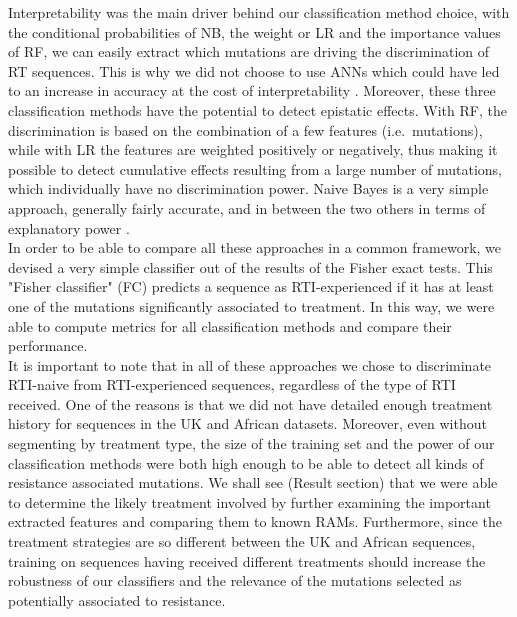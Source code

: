 \documentclass[
  11pt,
  twoside]{scrbook}
\begin{document}
Interpretability was the main driver behind our classification method
choice, with the conditional probabilities of NB, the weight or LR and
the importance values of RF, we can easily extract which mutations are
driving the discrimination of RT sequences. This is why we did not
choose to use ANNs which could have led to an increase in accuracy at
the cost of interpretability
\autocite{alvarezmelisRobustInterpretabilitySelfExplaining2018,hastieElementsStatisticalLearning2009,zhangInterpretableConvolutionalNeural2018}.
Moreover, these three classification methods have the potential to
detect epistatic effects. With RF, the discrimination is based on the
combination of a few features (i.e.~mutations), while with LR the
features are weighted positively or negatively, thus making it possible
to detect cumulative effects resulting from a large number of mutations,
which individually have no discrimination power. Naive Bayes is a very
simple approach, generally fairly accurate, and in between the two
others in terms of explanatory power
\autocite{gascuelTwelveNumericalSymbolic1998}.\\
In order to be able to compare all these approaches in a common
framework, we devised a very simple classifier out of the results of the
Fisher exact tests. This "Fisher classifier" (FC) predicts a sequence
as RTI-experienced if it has at least one of the mutations significantly
associated to treatment. In this way, we were able to compute metrics
for all classification methods and compare their performance.\\
It is important to note that in all of these approaches we chose to
discriminate RTI-naive from RTI-experienced sequences, regardless of the
type of RTI received. One of the reasons is that we did not have
detailed enough treatment history for sequences in the UK and African
datasets. Moreover, even without segmenting by treatment type, the size
of the training set and the power of our classification methods were
both high enough to be able to detect all kinds of resistance associated
mutations. We shall see (Result section) that we were able to determine
the likely treatment involved by further examining the important
extracted features and comparing them to known RAMs. Furthermore, since
the treatment strategies are so different between the UK and African
sequences, training on sequences having received different treatments
should increase the robustness of our classifiers and the relevance of
the mutations selected as potentially associated to resistance.\\
\end{document}
